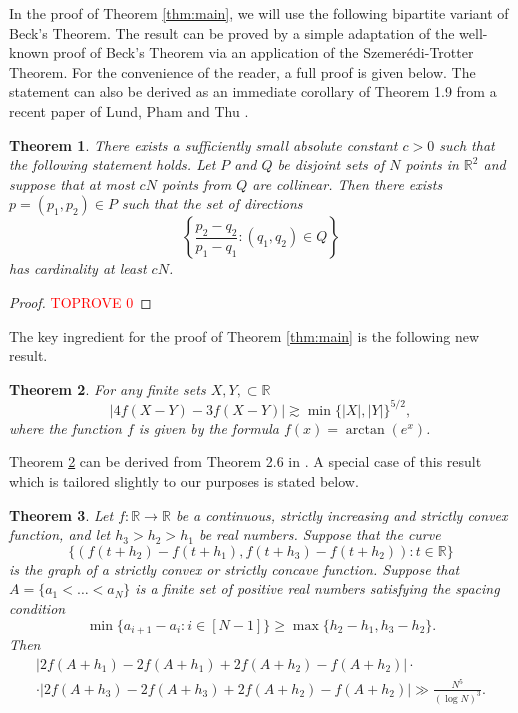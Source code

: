 \documentclass[11pt,oneside]{amsart}
\numberwithin{exercise}{subsection}
\newtheorem{theorem}{Theorem}
\begin{document}
In the proof of Theorem \ref{thm:main}, we will use the following bipartite variant of Beck's Theorem. The result can be proved by a simple adaptation of the well-known proof of Beck's Theorem via an application of the Szemer\'{e}di-Trotter Theorem. For the convenience of the reader, a full proof is given below. The statement can also be derived as an immediate corollary of Theorem 1.9 from a recent paper of Lund, Pham and Thu \cite{LPT}.

\begin{theorem} \label{thm:beck}
There exists a sufficiently small absolute constant $c>0$ such that the following statement holds. Let $P$ and $Q$ be disjoint sets of $N$ points in $\mathbb R^2$ and suppose that at most $cN$ points from $Q$ are collinear. Then there exists $p=(p_1,p_2) \in P$ such that the set of directions
\[
\left \{ \frac{p_2-q_2}{p_1-q_1} : (q_1,q_2) \in Q \right \}
\]
has cardinality at least $cN$.
\end{theorem}

\begin{proof}\textcolor{red}{TOPROVE 0}\end{proof}

The key ingredient for the proof of Theorem \ref{thm:main} is the following new result. \begin{theorem} \label{thm:key}
For any finite sets $X,Y, \subset \mathbb R$
\[
|4f(X-Y) - 3f(X-Y)| \gtrsim \min \{ |X|,|Y| \}^{5/2},
\]
where the function $f$ is given by the formula $f(x)=\arctan(e^x)$.
\end{theorem}

Theorem \ref{thm:key} can be derived from Theorem 2.6 in \cite{HRNS}. A special case of this result which is tailored slightly to our purposes is stated below.


\begin{theorem}\label{thm:MainExpander}
Let $f: \mathbb R\to\mathbb R$ be a continuous, strictly increasing and strictly convex function, and let $h_3>h_2>h_1$ be real numbers. Suppose that the curve
\begin{equation} \label{impy}
 \{(f(t+h_2)-f(t+h_1),f(t+h_3)-f(t+h_2)) : t\in \mathbb R\}
\end{equation}
is the graph of a strictly convex or strictly concave function.  Suppose that $A=\{a_1<\ldots<a_N\}$ is a finite set of positive real numbers satisfying the spacing condition
\[
\min\{a_{i+1}-a_i:i\in[N-1]\}\geq \max\{h_2-h_1, h_3-h_2\}.
\] 
Then
\begin{multline*}|2f(A+h_1)-2f(A+h_1)+2f(A+h_2)-f(A+h_2)|\cdot\\\cdot|2f(A+h_3)-2f(A+h_3)+2f(A+h_2)-f(A+h_2)| \gg \frac{N^5}{(\log N)^3}.
\end{multline*}
\end{theorem}
\end{document}
